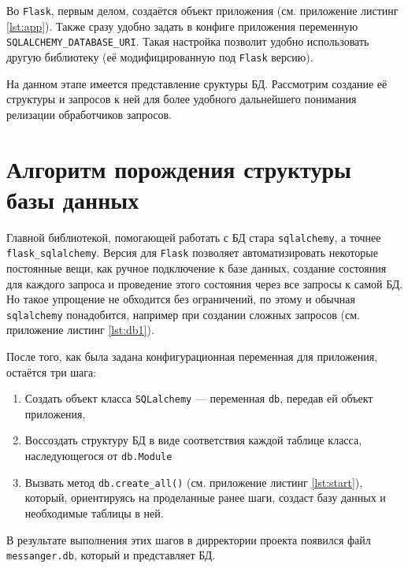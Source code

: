 \documentclass[14pt,final]{report}
\begin{document}
Во \texttt{Flask}, первым делом, создаётся объект приложения (см. приложение листинг \ref{lst:app}). Также сразу удобно задать в конфиге приложения переменную \texttt{SQLALCHEMY_DATABASE_URI}. Такая настройка позволит удобно использовать другую библиотеку (её модифицированную под \texttt{Flask} версию). 

На данном этапе имеется представление сруктуры БД. Рассмотрим создание её структуры и запросов к ней для более удобного дальнейшего понимания релизации обработчиков запросов.

\section{Алгоритм порождения структуры базы данных}
\label{sec:struct-bd}

Главной библиотекой, помогающей работать с БД стара \texttt{sqlalchemy}, а точнее \texttt{flask_sqlalchemy}. Версия для \texttt{Flask} позволяет автоматизировать некоторые постоянные вещи, как ручное подключение к базе данных, создание состояния для каждого запроса и проведение этого состояния через все запросы к самой БД. Но такое упрощение не обходится без ограничений, по этому и обычная \texttt{sqlalchemy} понадобится, например при создании сложных запросов (см. приложение листинг \ref{lst:db1}).

После того, как была задана конфигурационная переменная для приложения, остаётся три шага:
\begin{enumerate}
    \item Создать объект класса \texttt{SQLalchemy} --- переменная \texttt{db}, передав ей объект приложения,
    \item Воссоздать структуру БД в виде соответствия каждой таблице класса, наследующегося от \texttt{db.Module}
    \item Вызвать метод \texttt{db.create_all()} (см. приложение листинг \ref{lst:start}), который, ориентируясь на проделанные ранее шаги, создаст базу данных и необходимые таблицы в ней.
\end{enumerate}
В результате выполнения этих шагов в дирректории проекта появился файл \texttt{messanger.db}, который и представляет БД. 
\end{document}
